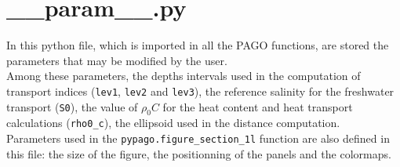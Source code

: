 \section{\_\_param\_\_.py}
\label{sec:param}

In this python file, which is imported in all the PAGO functions, are
stored the parameters that may be modified by the user. \\

Among these parameters, the depths intervals used in the computation
of transport indices (\verb+lev1+, \verb+lev2+ and \verb+lev3+), the
reference salinity for the freshwater transport (\verb+S0+), the value
of $\rho_0C$ for the heat content and heat transport calculations
(\verb+rho0_c+), the ellipsoid used in the distance computation.\\

Parameters used in the \verb+pypago.figure_section_1l+ function are also defined in
this file: the size of the figure, the positionning of the panels and
the colormaps.\\
